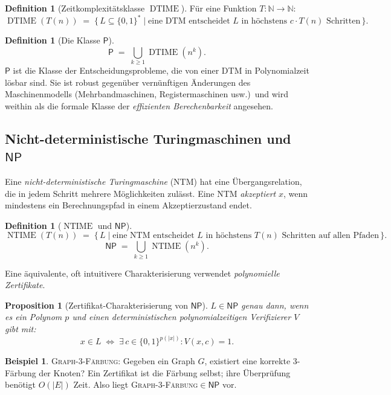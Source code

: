 \documentclass[12pt,a4paper]{amsart}
\newtheorem{proposition}[theorem]{Proposition}
\theoremstyle{definition}
\newtheorem{definition}[theorem]{Definition}
\newtheorem{example}[theorem]{Beispiel}
\newcommand{\Pclass}{\mathsf{P}}
\newcommand{\NP}{\mathsf{NP}}
\newcommand{\N}{\mathbb{N}}
\DeclareMathOperator{\DTIME}{DTIME}
\DeclareMathOperator{\NTIME}{NTIME}
\begin{document}
\begin{definition}[Zeitkomplexitätsklasse $\DTIME$]
Für eine Funktion $T\colon\N\to\N$:
\[
  \DTIME(T(n)) \;=\;
  \bigl\{\,L\subseteq\{0,1\}^* \;\big|\;
    \text{eine DTM entscheidet }L\text{ in höchstens }c\cdot T(n)\text{ Schritten}\,\bigr\}.
\]
\end{definition}

\begin{definition}[Die Klasse $\Pclass$]
\[
  \Pclass \;=\; \bigcup_{k\geq 1} \DTIME(n^k).
\]
$\Pclass$ ist die Klasse der Entscheidungsprobleme, die von einer DTM in
Polynomialzeit lösbar sind.  Sie ist robust gegenüber vernünftigen Änderungen
des Maschinenmodells (Mehrbandmaschinen, Registermaschinen usw.)\ und wird
weithin als die formale Klasse der \emph{effizienten Berechenbarkeit} angesehen.
\end{definition}

\subsection{Nicht-deterministische Turingmaschinen und $\NP$}

Eine \emph{nicht-deterministische Turingmaschine} (NTM) hat eine
Übergangsrelation, die in jedem Schritt mehrere Möglichkeiten zulässt.
Eine NTM \emph{akzeptiert} $x$, wenn mindestens ein Berechnungspfad in einem
Akzeptierzustand endet.

\begin{definition}[$\NTIME$ und $\NP$]
\[
  \NTIME(T(n)) \;=\;
  \bigl\{\,L \;\big|\;
    \text{eine NTM entscheidet }L\text{ in höchstens }T(n)\text{ Schritten auf allen Pfaden}\,\bigr\}.
\]
\[
  \NP \;=\; \bigcup_{k\geq 1} \NTIME(n^k).
\]
\end{definition}

Eine äquivalente, oft intuitivere Charakterisierung verwendet
\emph{polynomielle Zertifikate}.

\begin{proposition}[Zertifikat-Charakterisierung von $\NP$]
$L\in\NP$ genau dann, wenn es ein Polynom $p$ und einen deterministischen
polynomialzeitigen Verifizierer $V$ gibt mit:
\[
  x\in L \;\iff\; \exists\,c\in\{0,1\}^{p(|x|)}: V(x,c) = 1.
\]
\end{proposition}

\begin{example}
  \textsc{Graph-3-Färbung}: Gegeben ein Graph $G$, existiert eine korrekte
  3-Färbung der Knoten?  Ein Zertifikat ist die Färbung selbst; ihre
  Überprüfung benötigt $O(|E|)$ Zeit.  Also liegt
  \textsc{Graph-3-Färbung}$\in\NP$ vor.
\end{example}
\end{document}

